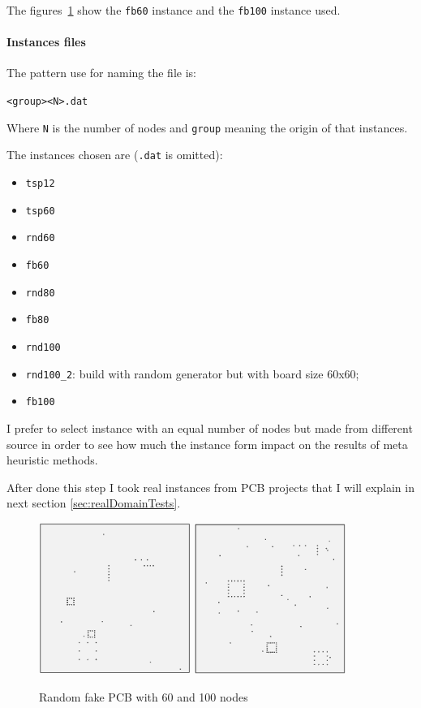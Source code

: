 	The figures~\ref{fig:fakeBoards} show the \verb|fb60| instance and the \verb|fb100| instance used.
	
\newpage
	\paragraph{Instances files}
	The pattern use for naming the file is:
	\begin{center}
		\verb|<group><N>.dat|
	\end{center}
	Where \verb|N| is the number of nodes and \verb|group| meaning the origin of that instances.
	
	The instances chosen are (\verb|.dat| is omitted):
	\begin{itemize}
		\item \verb|tsp12|
		\item \verb|tsp60|
		\item \verb|rnd60|
		\item \verb|fb60|
		\item \verb|rnd80|
		\item \verb|fb80|
		\item \verb|rnd100|
		\item \verb|rnd100_2|: build with random generator but with board size 60x60;
		\item \verb|fb100|
	\end{itemize}
	I prefer to select instance with an equal number of nodes but made from different source in order to see how much the instance form impact on the results of meta heuristic methods.
	
	After done this step I took real instances from PCB projects that I will explain in next section \ref{sec:realDomainTests}. 

	\begin{figure}[hb]
		\centering
		\includegraphics[width=0.44\textwidth]{img/fb60}%
		\qquad\qquad
		\includegraphics[width=0.44\textwidth]{img/fb100}
		\caption{Random fake PCB with 60 and 100 nodes}
		\label{fig:fakeBoards}
	\end{figure}